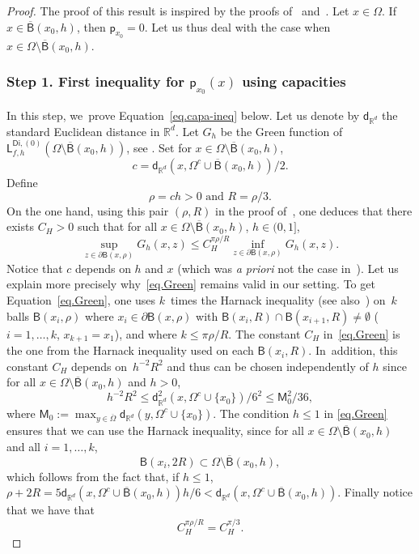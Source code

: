 \documentclass[10pt]{amsart}
\let\pa\partial
\theoremstyle{plain}
\theoremstyle{definition}
\begin{document}
\begin{proof}
The proof of this result is inspired by the proofs of~\cite[Lem.\,4.6]{BEGK} and~\cite[Prop.\,7.9]{landim2017dirichlet}. Let $x\in \Omega$. If~$x\in \overline{\mathsf B}(x_0,h)$, then $\mathsf p_{x_0}=0$. Let us thus deal with the case when $x\in \Omega\setminus \overline{\mathsf B}(x_0,h)$.

\subsubsection*{Step 1. First inequality for $ \mathsf p_{x_0}(x)$ using capacities}

In this step, we~prove Equation~\eqref{eq.capa-ineq} below. Let us denote by $\mathsf d_{\mathbb R^d}$ the standard Euclidean distance in $\mathbb R^d$. Let $G_h$ be the Green function of $ \mathsf L^{\mathsf{Di},(0)}_{f,h}(\Omega\setminus \overline{\mathsf B}(x_0,h))$, see \cite[Eq.\,(2.3)]{BEGK}.
Set for $x\in \Omega\setminus \overline{\mathsf B}(x_0,h)$,
\begin{equation}\label{eq.cc}
c=\mathsf d_{\mathbb R^d}(x, \Omega^c\cup \overline{\mathsf B}(x_0,h))/2.
\end{equation}
Define
\[
\text{$\rho=ch>0$ and $R=\rho/3$}.
\]
On the one hand, using this pair $(\rho,R)$ in the proof of~\cite[Lem.\,4.6]{BEGK}, one deduces that there exists $C_H>0$ such that for all $x\in\Omega\setminus \overline{\mathsf B}(x_0,h) $, $h\in (0,1]$,
\begin{equation}\label{eq.Green}
\sup_{z\in \pa \mathsf B(x,\rho)}G_h(x,z) \le C_H^{\pi \rho/R}\inf_{z\in \pa \mathsf B(x,\rho)}G_h (x,z).
\end{equation}
Notice that $c$ depends on $h$ and $x$ (which was \textit{a priori} not the case in~\cite[Lem.\,4.6]{BEGK}). Let us explain more precisely why~\eqref{eq.Green} remains valid in our setting. To get Equation~\eqref{eq.Green}, one uses $k$~times the Harnack inequality \cite{MR1814364} (see also~\cite[Lem.\,4.1]{BEGK}) on~$k$ balls $\mathsf B(x_i,\rho)$ where $x_i\in \pa\mathsf B(x,\rho)$ with $\mathsf B(x_i,R)\cap \mathsf B(x_{i+1},R)\neq \emptyset$ ($i=1,\ldots,k$, $x_{k+1}=x_1$), and where $k\le \pi \rho/R$. The constant $C_H$ in~\eqref{eq.Green} is the one from the Harnack inequality used on each $\mathsf B(x_i,R)$. In~addition, this constant $C_H$ depends on~$h^{-2} R^2$ and thus can be chosen independently of $h$ since for all $x\in\Omega\setminus \overline{\mathsf B}(x_0,h)$ and $h>0$,
\[
h^{-2} R^2 \le \mathsf d_{\mathbb R^d}^2(x, \Omega^c\cup \{x_0\})/6^2 \le \mathsf M_0^2/36,
\]
where $\mathsf M_0:=\max_{y\in \overline{\Omega} }\mathsf d_{\mathbb R^d}(y, \Omega^c\cup \{x_0\})$.
The condition $h\le 1$ in \eqref{eq.Green} ensures that we can use the Harnack inequality, since for all $x\in \Omega\setminus \overline{\mathsf B}(x_0,h)$ and all $i=1,\ldots,k$,
\[
{\mathsf B(x_i,2R)} \subset \Omega\setminus \overline{\mathsf B}(x_0,h),
\]
which follows from the fact that, if $h\le 1$, $\rho +2R=5\mathsf d_{\mathbb R^d}(x, \Omega^c\cup \overline{\mathsf B}(x_0,h))h/6<\mathsf d_{\mathbb R^d}(x, \Omega^c\cup \overline{\mathsf B}(x_0,h))$.
Finally notice that we have that
\[
C_H^{\pi \rho/R}=C_H^{\pi /3}.
\]


\end{proof}
\end{document}
